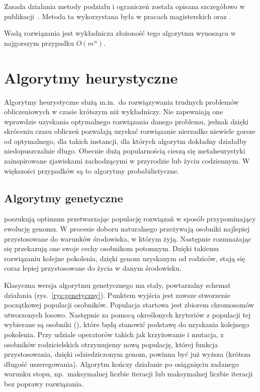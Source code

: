 Zasada działania metody podziału i ograniczeń została opisana szczegółowo w publikacji~\cite{bop}. Metoda ta wykorzystana była w pracach magisterskich 
\cite{daniel} oraz \cite{zietkiewicz}.

Wadą rozwiązania jest wykładnicza złożoność tego algorytmu wynosząca w najgorszym przypadku $O(m^n)$.

\section{Algorytmy heurystyczne}

Algorytmy heurystyczne służą m.in.~do rozwiązywania trudnych problemów obliczeniowych w czasie krótszym niż wykładniczy. 
Nie zapewniają one wprawdzie uzyskania optymalnego rozwiązania danego problemu, jednak dzięki skróceniu czasu obliczeń pozwalają 
uzyskać rozwiązanie nierzadko niewiele gorsze od optymalnego, dla takich instancji, dla których algorytm dokładny działałby niedopuszczalnie 
długo. Obecnie dużą popularnością cieszą się metaheurystyki zainspirowane zjawiskami zachodzącymi w przyrodzie lub życiu codziennym. W większości 
przypadków są to algorytmy probabilistyczne.

\subsection{Algorytmy genetyczne}

 poszukują optimum przetwarzając populację rozwiązań w sposób przypominający ewolucję genomu. W procesie doboru naturalnego 
przeżywają osobniki najlepiej przystosowane do warunków środowiska, w którym żyją. Następnie rozmnażając się przekazują one swoje cechy 
osobnikom potomnym. Dzięki takiemu rozwiązaniu kolejne pokolenia, dzięki genom uzyskanym od rodziców, stają się coraz lepiej przystosowane do 
życia w danym środowisku.

Klasyczna wersja algorytmu genetycznego ma stały, powtarzalny schemat działania (rys.~\vref{rys:genetyczny}). Punktem wyjścia jest zawsze 
stworzenie początkowej populacji osobników. Populacja startowa jest zbiorem chromosomów utworzonych losowo. Następnie za pomocą 
określonych kryteriów z populacji tej wybierane są osobniki (), 
które będą stanowić podstawę do uzyskania kolejnego pokolenia. Przy udziale operatorów takich jak krzyżowanie i mutacja, 
z osobników rodzicielskich otrzymujemy nową populację, której funkcja przystosowania, dzięki odziedziczonym genom, powinna być 
już wyższa (krótsza długość uszeregowania). Algorytm kończy działanie po osiągnięciu zadanego warunku stopu, np.~maksymalnej 
liczbie iteracji lub maksymalnej liczbie iteracji bez poprawy rozwiązania.

